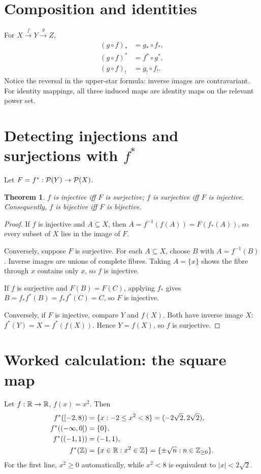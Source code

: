 \documentclass[11pt,openany]{book}
\newtheorem{theorem}{Theorem}[chapter]
\theoremstyle{definition}
\begin{document}
\section{Composition and identities}
For $X\xrightarrow{f}Y\xrightarrow{g}Z$,
\begin{align*}
(g\circ f)_*&=g_*\circ f_*,\\
(g\circ f)^*&=f^*\circ g^*,\\
(g\circ f)_!&=g_!\circ f_!.
\end{align*}
Notice the reversal in the upper-star formula: inverse images are contravariant. For identity mappings, all three induced maps are identity maps on the relevant power set.

\section{Detecting injections and surjections with $f^*$}
Let $F=f^*:\mathcal P(Y)\to\mathcal P(X)$.
\begin{theorem}
$f$ is injective iff $F$ is surjective; $f$ is surjective iff $F$ is injective. Consequently, $f$ is bijective iff $F$ is bijective.
\end{theorem}
\begin{proof}
If $f$ is injective and $A\subseteq X$, then $A=f^{-1}(f(A))=F(f_*(A))$, so every subset of $X$ lies in the image of $F$.

Conversely, suppose $F$ is surjective. For each $A\subseteq X$, choose $B$ with $A=f^{-1}(B)$. Inverse images are unions of complete fibres. Taking $A=\{x\}$ shows the fibre through $x$ contains only $x$, so $f$ is injective.

If $f$ is surjective and $F(B)=F(C)$, applying $f_*$ gives
$B=f_*f^*(B)=f_*f^*(C)=C$, so $F$ is injective.

Conversely, if $F$ is injective, compare $Y$ and $f(X)$. Both have inverse image $X$:
$f^*(Y)=X=f^*(f(X))$. Hence $Y=f(X)$, so $f$ is surjective.
\end{proof}

\section{Worked calculation: the square map}
Let $f:\mathbb R\to\mathbb R$, $f(x)=x^2$. Then
\begin{align*}
f^*([-2,8))&=\{x:-2\le x^2<8\}=(-2\sqrt2,2\sqrt2),\\
f^*((-\infty,0])&=\{0\},\\
f^*((-1,1))&=(-1,1),\\
f^*(\mathbb Z)&=\{x\in\mathbb R:x^2\in\mathbb Z\}
=\{\pm\sqrt n:n\in\mathbb Z_{\ge0}\}.
\end{align*}
For the first line, $x^2\ge0$ automatically, while $x^2<8$ is equivalent to $|x|<2\sqrt2$.
\end{document}
